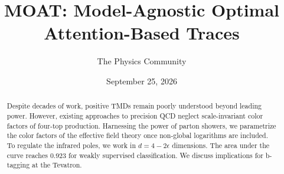 \documentclass[11pt]{article}
\title{MOAT: Model-Agnostic Optimal Attention-Based Traces}
\author{The Physics Community}
\date{September 25, 2026}
\begin{document}
\maketitle
\begin{abstract}
Despite decades of work, positive TMDs remain poorly understood beyond
leading power. However, existing approaches to precision QCD neglect
scale-invariant color factors of four-top production. Harnessing the
power of parton showers, we parametrize the color factors of the
effective field theory once non-global logarithms are included. To
regulate the infrared poles, we work in $d = 4 - 2\epsilon$ dimensions.
The area under the curve reaches 0.923 for weakly supervised
classification. We discuss implications for b-tagging at the Tevatron.
\end{abstract}
\tableofcontents



\nocite{*}


\end{document}
